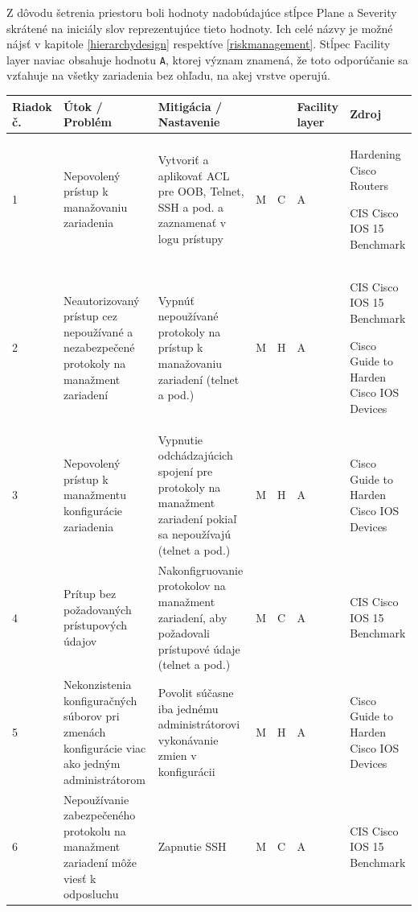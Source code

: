 Z dôvodu šetrenia priestoru boli hodnoty nadobúdajúce stĺpce Plane a Severity skrátené na iniciály slov reprezentujúce tieto hodnoty. Ich celé názvy je možné nájsť v kapitole \ref{hierarchydesign} respektíve \ref{riskmanagement}. Stĺpec Facility layer naviac obsahuje hodnotu \texttt{A}, ktorej význam znamená, že toto odporúčanie sa vzťahuje na všetky zariadenia bez ohľadu, na akej vrstve operujú.  

\newpage



\footnotesize
{}
\begin{longtable}[!htbp]{|C{2.5em}L{9em}L{9em}C{2em}C{2.5em}C{7.5em}L{10em}|}
	
	\hline
	\centering
	
	Riadok č.	&Útok / Problém	&Mitigácia / Nastavenie	& 	&	&Facility layer	&Zdroj\\
	\endhead
	
	 1	&Nepovolený prístup k manažovaniu zariadenia	&Vytvoriť a aplikovať ACL pre OOB, Telnet, SSH a pod. a zaznamenať v logu prístupy	&M	&C	&A	&Hardening Cisco Routers \cite{Akin2002}
	
	CIS Cisco IOS 15 Benchmark \cite{CIS_DrTLsgXv24lxeIIM}	\\
	2	&Neautorizovaný prístup cez nepoužívané a nezabezpečené protokoly na manažment zariadení	&Vypnúť nepoužívané protokoly na prístup k manažovaniu zariadení (telnet a pod.)	&M	&H	&A	&CIS Cisco IOS 15 Benchmark \cite{CIS_DrTLsgXv24lxeIIM}
	
	Cisco Guide to Harden Cisco IOS Devices \cite{Singh2018}
	\\
	 3	&Nepovolený prístup k manažmentu konfigurácie zariadenia	&Vypnutie odchádzajúcich spojení pre protokoly na manažment zariadení pokiaľ sa nepoužívajú (telnet a pod.)	&M	&H	&A	&Cisco Guide to Harden Cisco IOS Devices \cite{Singh2018}	\\
	4	&Prítup bez požadovaných prístupových údajov	&Nakonfigruovanie protokolov na manažment zariadení, aby požadovali prístupové údaje (telnet a pod.)	&M	&C	&A	&CIS Cisco IOS 15 Benchmark \cite{CIS_DrTLsgXv24lxeIIM}	\\
	 5	&Nekonzistenia konfiguračných súborov pri zmenách konfigurácie viac ako jedným administrátorom	&Povolit súčasne iba jednému administrátorovi vykonávanie zmien v konfigurácii	&M	&H	&A	&Cisco Guide to Harden Cisco IOS Devices \cite{Singh2018}	\\
	6	&Nepoužívanie zabezpečeného protokolu na manažment zariadení môže viesť k odposluchu	&Zapnutie SSH	&M	&C	&A	&CIS Cisco IOS 15 Benchmark \cite{CIS_DrTLsgXv24lxeIIM}
	

\end{longtable}
